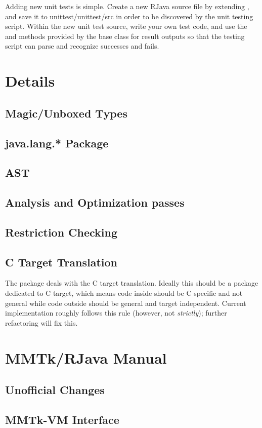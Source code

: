 \documentclass[12pt]{article}
\begin{document}
Adding new unit tests is simple. Create a new RJava source file by
extending , and save it to
unittest/unittest/src in order to be discovered by the unit testing script. 
Within the new unit test source, write your own test code, and use 
the  and  methods provided
by the base class for result outputs so that the testing
script can parse and recognize successes and fails. 

\section{\rjcfull Details}

\subsection{Magic/Unboxed Types}
\subsection{java.lang.* Package}
\subsection{\rjcfull AST}
\subsection{Analysis and Optimization passes}
\subsection{Restriction Checking}
\subsection{C Target Translation}

The  package deals with 
the C target translation. Ideally this should be a package 
dedicated to C target, which means code inside should be C specific 
and not general while code outside should be general and 
target independent. 
Current implementation roughly follows this rule 
(however, not \emph{strictly}); further refactoring will fix this. 

\section{MMTk/RJava Manual}

\subsection{Unofficial Changes}
\subsection{MMTk-VM Interface}
\end{document}
